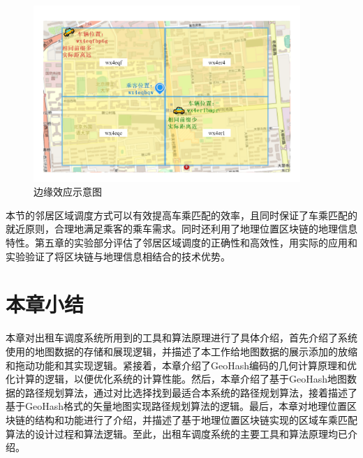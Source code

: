 \begin{figure}[h]
  \centering
  \includegraphics[width=0.9\textwidth]{figures/边缘效应}
  \caption{边缘效应示意图}\label{fig:special}
\end{figure}

本节的邻居区域调度方式可以有效提高车乘匹配的效率，且同时保证了车乘匹配的就近原则，合理地满足乘客的乘车需求。同时还利用了地理位置区块链的地理信息特性。第五章的实验部分评估了邻居区域调度的正确性和高效性，用实际的应用和实验验证了将区块链与地理信息相结合的技术优势。

\section{本章小结}
本章对出租车调度系统所用到的工具和算法原理进行了具体介绍，首先介绍了系统使用的地图数据的存储和展现逻辑，并描述了本工作给地图数据的展示添加的放缩和拖动功能和其实现逻辑。紧接着，本章介绍了GeoHash编码的几何计算原理和优化计算的逻辑，以便优化系统的计算性能。然后，本章介绍了基于GeoHash地图数据的路径规划算法，通过对比选择找到最适合本系统的路径规划算法，接着描述了基于GeoHash格式的矢量地图实现路径规划算法的逻辑。最后，本章对地理位置区块链的结构和功能进行了介绍，并描述了基于地理位置区块链实现的区域车乘匹配算法的设计过程和算法逻辑。至此，出租车调度系统的主要工具和算法原理均已介绍。
